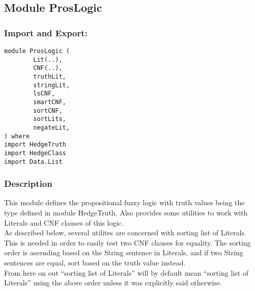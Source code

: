 \documentclass[../gr-final.tex]{subfiles}
\begin{document}
\subsection{Module ProsLogic}
\subsubsection{Import and Export:}
\begin{lstlisting}
module ProsLogic (
        Lit(..),
        CNF(..),
        truthLit,
        stringLit,
        lsCNF,
        smartCNF,
        sortCNF,
        sortLits,
        negateLit,
) where
import HedgeTruth
import HedgeClass
import Data.List
\end{lstlisting}
\subsubsection{Description}
This module defines the propositional fuzzy logic with truth
values being the type defined in module HedgeTruth. Also provides
some utilities to work with Literals and CNF clauses of this
logic.\\
As described below, several utilites are concerned with sorting
list of Literals. This is needed in order to easily test two
CNF clauses for equality. The sorting order is ascending based on
the String sentence in Literals, and if two String sentences are
equal, sort based on the truth value instead.\\
From here on out ``sorting list of Literals'' will by default
mean ``sorting list of Literals'' using the above order unless it
was explicitly said otherwise.
\end{document}
